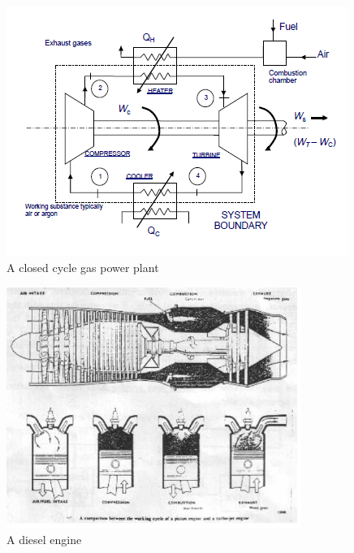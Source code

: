 \documentclass[class=report, crop=false, 12pt,a4paper]{standalone}
\begin{document}
\begin{figure}[H]
  \begin{center}
    \includegraphics[width = \textwidth]{../img/ClosedCycleGasPP}
    \caption{A closed cycle gas power plant}
  \end{center}
\end{figure}
\begin{figure}[H]
  \begin{center}
    \includegraphics[width = \textwidth]{../img/DieselEngine}
    \caption{A diesel engine}
  \end{center}
\end{figure}
\end{document}
